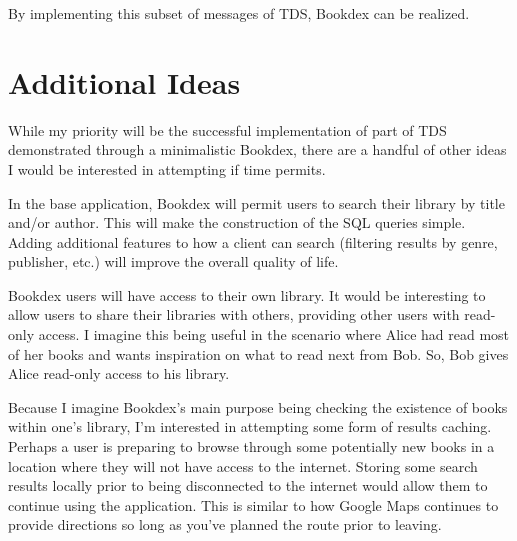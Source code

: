 \documentclass[12pt]{article}
\begin{document}
By implementing this subset of messages of TDS, Bookdex can be realized.

\section*{Additional Ideas}
While my priority will be the successful implementation of part of TDS demonstrated through a minimalistic Bookdex, there are a handful of other ideas I would be interested in attempting if time permits.

In the base application, Bookdex will permit users to search their library by title and/or author. This will make the construction of the SQL queries simple. Adding additional features to how a client can search (filtering results by genre, publisher, etc.) will improve the overall quality of life.

Bookdex users will have access to their own library. It would be interesting to allow users to share their libraries with others, providing other users with read-only access. I imagine this being useful in the scenario where Alice had read most of her books and wants inspiration on what to read next from Bob. So, Bob gives Alice read-only access to his library.

Because I imagine Bookdex's main purpose being checking the existence of books within one's library, I'm interested in attempting some form of results caching. Perhaps a user is preparing to browse through some potentially new books in a location where they will not have access to the internet. Storing some search results locally prior to being disconnected to the internet would allow them to continue using the application. This is similar to how Google Maps continues to provide directions so long as you've planned the route prior to leaving.

\printbibliography
\end{document}
